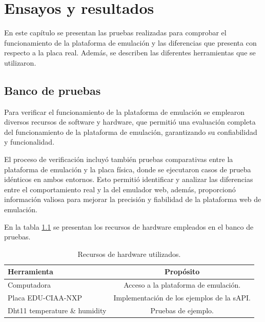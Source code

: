 
\chapter{Ensayos y resultados} %

\label{Chapter4} %

En este capítulo se presentan las pruebas realizadas para comprobar el funcionamiento de la plataforma de emulación y las diferencias que presenta con respecto a la placa real. Además, se describen las diferentes herramientas que se utilizaron.

\section{Banco de pruebas}

Para verificar el funcionamiento de la plataforma de emulación se emplearon diversos recursos de software y hardware, que permitió una evaluación completa del funcionamiento de la plataforma de emulación, garantizando su confiabilidad y funcionalidad. 

El proceso de verificación incluyó también pruebas comparativas entre la plataforma de emulación y la placa física, donde se ejecutaron casos de prueba idénticos en ambos entornos. Esto permitió identificar y analizar las diferencias entre el comportamiento real y la del emulador web, además, proporcionó información valiosa para mejorar la precisión y fiabilidad de la plataforma web de emulación.



En la tabla \ref{tab:RecursosHardware} se presentan los recursos de hardware empleados en el banco de pruebas.

\begin{table}[h]
	\centering
	\caption[Recursos de hardware utilizados]{Recursos de hardware utilizados.}
	\begin{tabular}{l c}    
		\toprule
		\textbf{Herramienta} & \textbf{Propósito}\\
		\midrule
		Computadora & Acceso a la plataforma de emulación.\\		
		Placa EDU-CIAA-NXP &  Implementación de los ejemplos de la sAPI.\\
		Dht11 temperature \& humidity  &  Pruebas de ejemplo.\\
		\bottomrule
		\hline
	\end{tabular}
	\label{tab:RecursosHardware}
\end{table}


